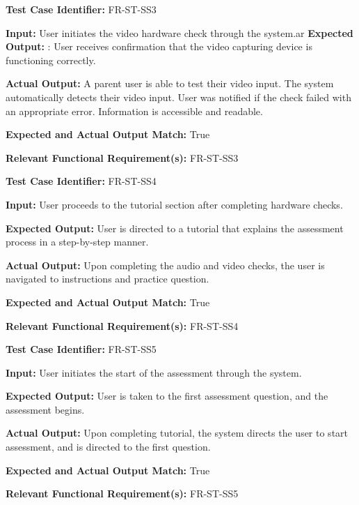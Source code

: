 \documentclass[12pt, titlepage]{article}
\begin{document}
\begin{mdframed}[linewidth=0.5mm] \par
  \textbf{Test Case Identifier:} FR-ST-SS3 \par
  \textbf{Input:} User initiates the video hardware check through the system.ar
  \textbf{Expected Output:} : User receives confirmation that the video capturing device is functioning
  correctly. \par
  \textbf{Actual Output:} A parent user is able to test their video input. The system automatically detects their video input. 
  User was notified if the check failed with an appropriate error. 
  Information is accessible and readable. \par
  \textbf{Expected and Actual Output Match:} True \par
  \textbf{Relevant Functional Requirement(s):} FR-ST-SS3 
\end{mdframed}


\begin{mdframed}[linewidth=0.5mm] \par
  \textbf{Test Case Identifier:} FR-ST-SS4 \par
  \textbf{Input:} User proceeds to the tutorial section after completing hardware checks.
  \par
  \textbf{Expected Output:} User is directed to a tutorial that explains the assessment process in a
  step-by-step manner. \par
  \textbf{Actual Output:} Upon completing the audio and video checks, the user is navigated to instructions and practice question. \par
  \textbf{Expected and Actual Output Match:} True \par
  \textbf{Relevant Functional Requirement(s):} FR-ST-SS4
\end{mdframed}

\begin{mdframed}[linewidth=0.5mm] \par
  \textbf{Test Case Identifier:} FR-ST-SS5 \par
  \textbf{Input:} User initiates the start of the assessment through the system.
  \par
  \textbf{Expected Output:} User is taken to the first assessment question, and the assessment begins.   \par
  \textbf{Actual Output:} Upon completing tutorial, the system directs the user to start assessment, and is directed to the first question. \par
  \textbf{Expected and Actual Output Match:} True \par
  \textbf{Relevant Functional Requirement(s):} FR-ST-SS5 
\end{mdframed}
\end{document}
